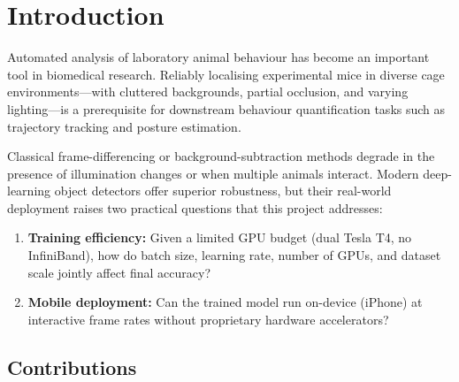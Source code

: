 \section{Introduction}
\label{sec:intro}

Automated analysis of laboratory animal behaviour has become an important
tool in biomedical research.  Reliably localising experimental mice in
diverse cage environments---with cluttered backgrounds, partial occlusion,
and varying lighting---is a prerequisite for downstream behaviour
quantification tasks such as trajectory tracking and posture estimation.

Classical frame-differencing or background-subtraction methods degrade in
the presence of illumination changes or when multiple animals interact.
Modern deep-learning object detectors offer superior robustness, but their
real-world deployment raises two practical questions that this project
addresses:

\begin{enumerate}[leftmargin=1.5em]
  \item \textbf{Training efficiency:} Given a limited GPU budget (dual
    Tesla T4, no InfiniBand), how do batch size, learning rate, number of
    GPUs, and dataset scale jointly affect final accuracy?

  \item \textbf{Mobile deployment:} Can the trained model run on-device
    (iPhone) at interactive frame rates without proprietary hardware
    accelerators?
\end{enumerate}

\subsection*{Contributions}

